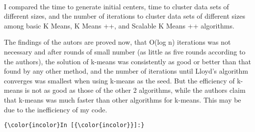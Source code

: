 \documentclass{article}
\begin{document}
    \begin{center}
    \end{center}
    { \hspace*{\fill} \\}
    
    I compared the time to generate initial centers, time to cluster data
sets of different sizes, and the number of iterations to cluster data
sets of different sizes among basic K Means, K Means ++, and Scalable K
Means ++ algorithms.

The findings of the autors are proved now, that O(log n) iterations was
not necessary and after rounds of small number (as little as five rounds
according to the authors), the solution of k-means\textbar{}\textbar{}
was consistently as good or better than that found by any other method,
and the number of iterations until Lloyd's algorithm converges was
smallest when using k-means\textbar{}\textbar{} as the seed. But the
efficiency of k-means\textbar{}\textbar{} is not as good as those of the
other 2 algorithms, while the authors claim that
k-means\textbar{}\textbar{} was much faster than other algorithms for
k-means. This may be due to the inefficiency of my code.

    \begin{Verbatim}[commandchars=\\\{\}]
{\color{incolor}In [{\color{incolor}}]:} 
\end{Verbatim}


    
    
    
    
\end{document}
